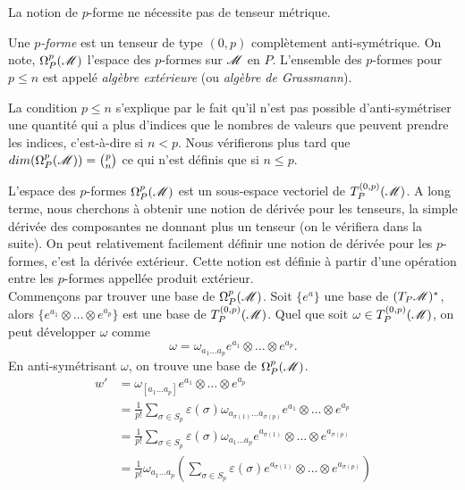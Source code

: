 \documentclass[a4paper,11pt]{report}
\begin{document}
            La notion de $p$-forme ne nécessite pas de tenseur métrique.
            
            \begin{defn}
                Une $p$\textit{-forme} est un tenseur de type $(0,p)$ complètement anti-symétrique. On note, $\Omega_P^p(\mathscr{M})$ l'espace des $p$-formes sur $\mathscr{M}$ en $P$. L'ensemble des $p$-formes pour $p\leq n$ est appelé \textit{algèbre extérieure} (ou \textit{algèbre de Grassmann}).
            \end{defn}
            
            \begin{rmk}
                La condition $p\leq n$ s'explique par le fait qu'il n'est pas possible d'anti-symétriser une quantité qui a plus d'indices que le nombres de valeurs que peuvent prendre les indices, c'est-à-dire si $n<p$. Nous vérifierons plus tard que $dim(\Omega_P^p(\mathscr{M})) = {p \choose n}$ ce qui n'est définis que si $n\leq p$.
            \end{rmk}
            
             L'espace des $p$-formes $\Omega_P^p(\mathscr{M})$ est un sous-espace vectoriel de $T_P^{(0,p)}(\mathscr{M})$. A long terme, nous cherchons à obtenir une notion de dérivée pour les tenseurs, la simple dérivée des composantes ne donnant plus un tenseur (on le vérifiera dans la suite). On peut relativement facilement définir une notion de dérivée pour les $p$-formes, c'est la dérivée extérieur. Cette notion est définie à partir d'une opération entre les $p$-formes appellée produit extérieur.\\
            
            Commençons par trouver une base de $\Omega_P^p(\mathscr{M})$. Soit $\{e^a\}$ une base de $(T_P\mathscr{M})^*$, alors $\{e^{a_1}\otimes\dots \otimes e^{a_p}\}$ est une base de $T_P^{(0,p)}(\mathscr{M})$. Quel que soit $\omega\in T_P^{(0,p)}(\mathscr{M})$, on peut développer $\omega$ comme
            \begin{equation}
                \omega = \omega_{a_1\dots a_p} e^{a_1}\otimes\dots\otimes e^{a_p}.
            \end{equation}
            En anti-symétrisant $\omega$, on trouve une base de $\Omega_P^p(\mathscr{M})$.
            \begin{align}\label{dev:pformebase}
                w' &= \omega_{[a_1\dots a_p]} e^{a_1}\otimes\dots\otimes e^{a_p}\\
                &= \frac{1}{p!} \sum_{\sigma\in S_p}\varepsilon(\sigma) \omega_{a_{\sigma(1)}\dots a_{\sigma(p)}} e^{a_1}\otimes\dots\otimes e^{a_p}\\
                &= \frac{1}{p!} \sum_{\sigma\in S_p}\varepsilon(\sigma) \omega_{a_1\dots a_p} e^{a_{\sigma(1)}}\otimes\dots\otimes e^{a_{\sigma(p)}}\\
                &= \frac{1}{p!}\omega_{a_1\dots a_p} \left( \sum_{\sigma\in S_p}\varepsilon(\sigma)  e^{a_{\sigma(1)}}\otimes\dots\otimes e^{a_{\sigma(p)}}\right)\label{eq:pformebase}
            \end{align}
            
\end{document}
